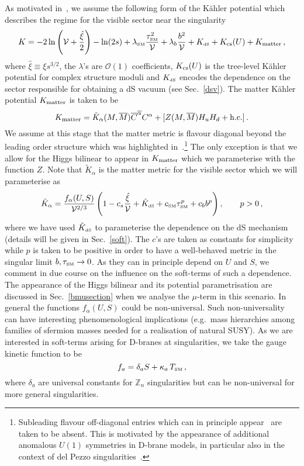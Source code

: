 \documentclass[11pt,a4paper]{article}
\newcommand{\be}{\begin{equation}}
\newcommand{\ee}{\end{equation}}
\def\SM{{\scriptscriptstyle \rm SM}}
\def\dS{{\scriptscriptstyle \rm dS}}
\def\cv{{{\cal{V}}}}
\newcommand\vo{{\mathcal{V}}}
\newcommand{\mc}{\mathcal}
\begin{document}
As motivated in~\cite{0810.5660,Blumenhagen:2009gk}, we assume the following form of the K\"ahler potential which describes the regime for the visible sector near the singularity
\be
\label{generalk}
K = - 2 \ln\left(\vo + \frac{\hat\xi}{2}\right) - \ln(2s) + \lambda_\SM \frac{\tau_\SM^2}{\vo} + \lambda_b \frac{b^2}{\vo}
+ K_\dS + K_{\rm cs}(U) + K_{\rm matter}\, ,
\ee
where $\hat\xi\equiv \xi s^{3/2}$, the $\lambda$'s are $\mc{O}(1)$ coefficients, $K_{\rm cs}(U)$ is the tree-level K\"ahler potential for complex structure moduli and $K_\dS$ encodes the dependence on the sector responsible
for obtaining a dS vacuum (see Sec.~\ref{dsv}).
The matter K\"ahler potential $K_{\rm matter}$ is taken to be
\be
K_{\rm matter} = \tilde{K}_{\alpha}(M, \overline{M}) \overline{C}^{\overline{\alpha}} C^{\alpha} + [Z(M, \overline{M}) H_u H_d + \text{h.c.}]\,.
\label{mm}
\ee
We assume at this stage that the matter metric is flavour diagonal beyond the leading order structure which was highlighted in~\cite{Conlon:2007dw}.\footnote{Subleading flavour off-diagonal entries which can in principle appear~\cite{Camara:2013fta} are taken to be absent. This is motivated by the appearance of additional anomalous $U(1)$ symmetries in D-brane models, in particular also in the context of del Pezzo singularities~\cite{1106.6039}.} The only exception is that we allow for the Higgs bilinear to appear in $K_{\rm matter}$
which we parameterise with the function $Z$.
Note that $\tilde{K}_\alpha$ is the matter metric for the visible sector which we will parameterise as~\cite{Blumenhagen:2009gk}
\be
\tilde{K}_{\alpha} = \frac{f_\alpha(U,S)}{\cv^{2/3}} \left(1 - c_s \frac{\hat\xi}{\cv}
+ \tilde{K}_\dS + c_\SM \tau_\SM^p + c_b b^p\right), \qquad p > 0\,,
\label{mattermetric}
\ee
where we have used $\tilde{K}_\dS$ to parameterise the dependence on the
dS mechanism (details will be given in Sec.~\ref{soft}). The $c$'s are taken as constants for simplicity while $p$ is taken to be positive
in order to have a well-behaved metric in the singular limit $b,\tau_\SM \to 0$.
As they can in principle depend on $U$ and $S$, we comment in due course on the influence on the soft-terms of such a dependence.
The appearance of the Higgs bilinear and its potential parametrisation are discussed in Sec.~\ref{bmusection} when we analyse the $\mu$-term in this scenario. In general the functions $f_\alpha(U,S)$ could be non-universal. Such non-universality can have interesting phenomenological implications (e.g.~mass hierarchies among families of sfermion masses needed for a realisation of natural SUSY).
As we are interested in soft-terms arising for D-branes at singularities, we take the gauge kinetic function to be
\be
f_a=\delta_a S+ \kappa_a \,T_\SM\, ,
\label{eq:gaugekineticf}
\ee
where $\delta_a$ are universal constants for $\mathbb{Z}_n$ singularities but can be non-universal for more general singularities.
\end{document}
